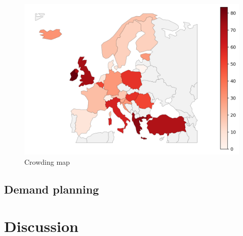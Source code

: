 \documentclass{article}
\begin{document}
\begin{figure}[H]
    \centering
        \includegraphics[width=1.0\textwidth]{../output/plots/crowding_map}
        \caption{Crowding map}
        \label{fig:crowding_map}
\end{figure}

\subsection{Demand planning}


\section{Discussion}
\lipsum[5]
\end{document}
